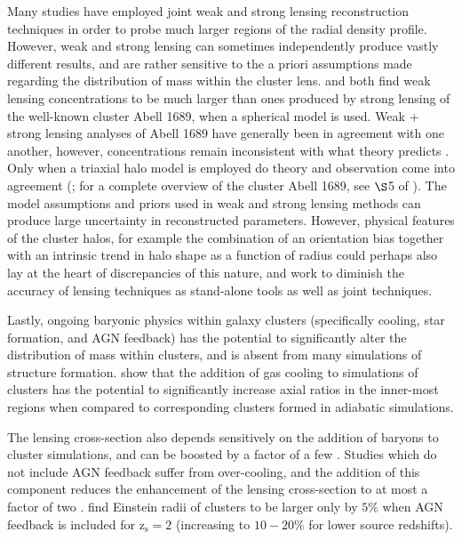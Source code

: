 Many studies have employed joint weak and strong lensing reconstruction
techniques in order to probe much larger regions of the radial density profile.
However, weak and strong lensing can sometimes independently produce
vastly different results, and are rather sensitive to the a priori
assumptions made regarding the distribution of mass within the cluster
lens. \citet{BroadhurstEtAl2005} and
\citet{HalkolaEtAl2006} both find weak lensing concentrations to be
much larger than ones produced by strong lensing of the well-known
cluster Abell 1689, when a spherical model is used. Weak + strong
lensing analyses of Abell 1689 have generally been in agreement with
one another, however, concentrations remain inconsistent with what
theory predicts
\citep{CL03.1,HalkolaEtAl2006,LimousinEtAl2007}. Only when a 
triaxial halo model is employed do theory 
and observation come into agreement (\citealt{OguriEtAl2005}; for a
complete overview of the cluster Abell 1689, see $\S$5 of
\citealt{LimousinEtAl2013}). The model assumptions and priors used in
weak and strong lensing methods can produce large uncertainty in
reconstructed parameters. However, physical features of the cluster
halos, for example the combination of an orientation bias together with an
intrinsic trend in halo shape as a function of radius could perhaps
also lay at the heart of discrepancies of this nature, and work to
diminish the accuracy of lensing techniques as stand-alone tools as
well as joint techniques. 

Lastly, ongoing baryonic physics within galaxy clusters
(specifically cooling, star formation, and AGN feedback) has the
potential to significantly alter the distribution of mass within
clusters, and is absent from many simulations of structure
formation. \citet{KazantzidisEtAl2004} show that the addition of gas
cooling to simulations of clusters has the potential to significantly
increase axial ratios in the inner-most regions when compared to
corresponding clusters formed in adiabatic simulations.

The lensing cross-section also depends sensitively on the
addition of baryons to cluster simulations, and can be boosted by a
factor of a few
\citep{PuchweinEtAl2005,WambsganssEtAl2008,RozoEtAl2008}. 
Studies which do not include AGN feedback suffer from over-cooling,
and the addition of this component reduces the enhancement of the
lensing cross-section to at most a factor of two
\citep{MeadEtAl2010}. \citet{KilledarEtAl2012} find Einstein radii of
clusters to be larger only by $5\%$ when AGN feedback is included for
$\mathrm{z_{s} = 2}$ (increasing to $10-20\%$ for lower source redshifts).

